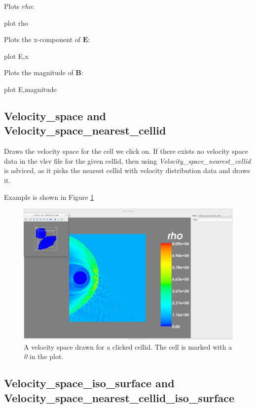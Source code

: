 \documentclass[a4paper,10pt]{article}
\begin{document}
Plots $rho$:
\begin{python}
plot rho
\end{python}
Plots the x-component of $\mathbf{E}$:
\begin{python}
plot E,x
\end{python}
Plots the magnitude of $\mathbf{B}$:
\begin{python}
plot E,magnitude
\end{python}

\newpage

\subsection{Velocity\_space and Velocity\_space\_nearest\_cellid}

Draws the velocity space for the cell we click on. If there exists no velocity space data in the vlsv 
file for the given cellid, then using \emph{Velocity\_space\_nearest\_cellid} is adviced, as it picks the 
nearest cellid with velocity distribution data and draws it.

Example is shown in Figure \ref{fig:vel_space}

\begin{figure}[H]
 \centering
 \includegraphics[width=\textwidth]{../../images/velocity_space_nearest_cellid.png}
 \caption{A velocity space drawn for a clicked cellid. The cell is marked with a \emph{0} in the plot.}
 \label{fig:vel_space}
\end{figure}


\subsection{Velocity\_space\_iso\_surface and Velocity\_space\_nearest\_cellid\_iso\_surface}
\end{document}
